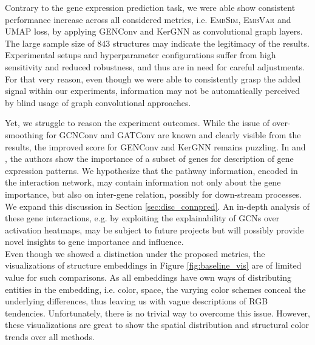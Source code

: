 \documentclass[]{article}
\begin{document}
Contrary to the gene expression prediction task, we were able show consistent performance increase across all considered metrics, i.e. \textsc{EmbSim}, \textsc{EmbVar} and UMAP loss, by applying GENConv and KerGNN as convolutional graph layers. The large sample size of $843$ structures may indicate the legitimacy of the results. Experimental setups and hyperparameter configurations suffer from high sensitivity and reduced robustness, and thus are in need for careful adjustments. For that very reason, even though we were able to consistently grasp the added signal within our experiments, information may not be automatically perceived by blind usage of graph convolutional approaches.

Yet, we struggle to reason the experiment outcomes. While the issue of over-smoothing for GCNConv and GATConv are known and clearly visible from the results, the improved score for GENConv and KerGNN remains puzzling. 
In \citet{Partel2020} and \citet{bohland2010clustering}, the authors show the importance of a subset of genes for description of gene expression patterns. We hypothesize that the pathway information, encoded in the interaction network, may contain information not only about the gene importance, but also on inter-gene relation, possibly for down-stream processes. We expand this discussion in Section \ref{sec:disc_connpred}. An in-depth analysis of these gene interactions, e.g. by exploiting the explainability of GCNs over activation heatmaps, may be subject to future projects but will possibly provide novel insights to gene importance and influence. \\

Even though we showed a distinction under the proposed metrics, the visualizations of structure embeddings in Figure \ref{fig:baseline_vis} are of limited value for such comparisons. As all embeddings have own ways of distributing entities in the embedding, i.e. color, space, the varying color schemes conceal the underlying differences, thus leaving us with vague descriptions of RGB tendencies. Unfortunately, there is no trivial way to overcome this issue. However, these visualizations are great to show the spatial distribution and structural color trends over all methods.
 
\end{document}
